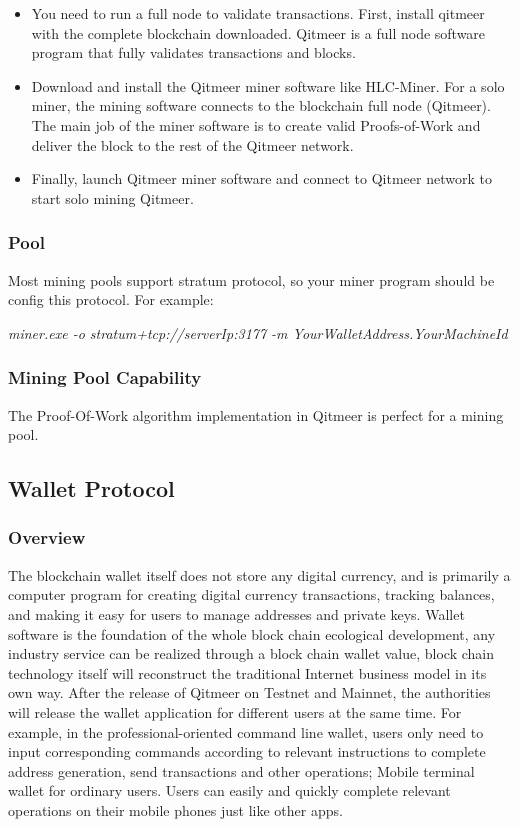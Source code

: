 \documentclass[a4paper,11pt]{article}
\begin{document}
\begin{itemize}
\item You need to run a full node to validate transactions. First, install qitmeer\cite{qitmeer} with the complete blockchain downloaded. Qitmeer is a full node software program that fully validates transactions and blocks. 
\item Download and install the Qitmeer miner software like HLC-Miner. For a solo miner, the mining software connects to the blockchain full node (Qitmeer). The main job of the miner software is to create valid Proofs-of-Work and deliver the block to the rest of the Qitmeer network.
\item Finally, launch Qitmeer miner software and connect to Qitmeer network to start solo mining Qitmeer.
\end{itemize}

\subsubsection*{Pool}
Most mining pools support stratum protocol, so your miner program should be config this protocol. 
For example:

\emph{miner.exe -o stratum+tcp://serverIp:3177 -m YourWalletAddress.YourMachineId}

\subsubsection{Mining Pool Capability}
The Proof-Of-Work algorithm implementation in Qitmeer is perfect for a mining pool.


\subsection{Wallet Protocol}
\subsubsection{Overview}
   The blockchain wallet itself does not store any digital currency, and is primarily a computer program for creating digital currency transactions, tracking balances, and making it easy for users to manage addresses and private keys. Wallet software is the foundation of the whole block chain ecological development, any industry service can be realized through a block chain wallet value, block chain technology itself will reconstruct the traditional Internet business model in its own way. After the release of Qitmeer on Testnet and Mainnet, the authorities will release the wallet application for different users at the same time. For example, in the professional-oriented command line wallet, users only need to input corresponding commands according to relevant instructions to complete address generation, send transactions and other operations; Mobile terminal wallet for ordinary users. Users can easily and quickly complete relevant operations on their mobile phones just like other apps.
\end{document}

